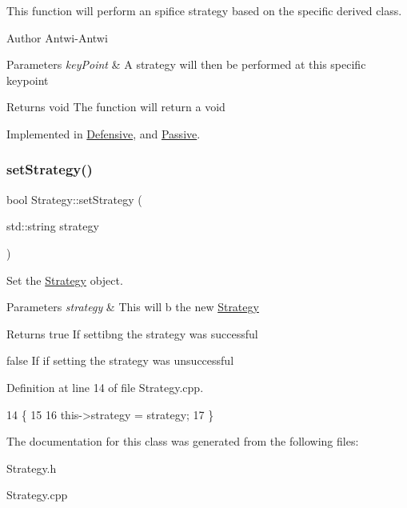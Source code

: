 This function will perform an spifice strategy based on the specific derived class. 

\begin{DoxyAuthor}{Author}
Antwi-\/\+Antwi 
\end{DoxyAuthor}

\begin{DoxyParams}{Parameters}
{\em key\+Point} & A strategy will then be performed at this specific keypoint \\
\hline
\end{DoxyParams}
\begin{DoxyReturn}{Returns}
void The function will return a void 
\end{DoxyReturn}


Implemented in \hyperlink{classDefensive_ad824897b2075d2184612ab6efcdd8367}{Defensive}, and \hyperlink{classPassive_a3aaac6b29f827a1a5260094db1eb4c68}{Passive}.

\mbox{\label{classStrategy_a35c4bbd2d37efaf24e21b7a0e82b4c96}} 
\subsubsection{\texorpdfstring{set\+Strategy()}{setStrategy()}}
{\footnotesize\ttfamily bool Strategy\+::set\+Strategy (\begin{DoxyParamCaption}\item[{std\+::string}]{strategy }\end{DoxyParamCaption})}



Set the \hyperlink{classStrategy}{Strategy} object. 


\begin{DoxyParams}{Parameters}
{\em strategy} & This will b the new \hyperlink{classStrategy}{Strategy} \\
\hline
\end{DoxyParams}
\begin{DoxyReturn}{Returns}
true If settibng the strategy was successful 

false If if setting the strategy was unsuccessful 
\end{DoxyReturn}


Definition at line 14 of file Strategy.\+cpp.


\begin{DoxyCode}
14                                          \{
15 
16     this->strategy = strategy;
17 \}
\end{DoxyCode}


The documentation for this class was generated from the following files\+:\begin{DoxyCompactItemize}
\item 
Strategy.\+h\item 
Strategy.\+cpp\end{DoxyCompactItemize}
